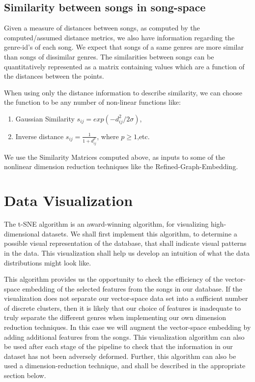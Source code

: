 \documentclass[10pt]{article}
\begin{document}
\subsection{Similarity between songs in song-space}
Given a measure of distances between songs, as computed by the computed/assumed distance metrics, we also have information regarding the genre-id's of each song. We expect that songs of a same genres are more similar than songs of dissimilar genres. The similarities between songs can be quantitatively represented as a matrix containing values which are a function of the distances between the points. 

When using only the distance information to describe similarity, we can choose the function to be any number of non-linear functions like:
\begin{enumerate}
\item Gaussian Similarity $s_{ij} = exp(-d_{ij}^2 / 2\sigma)$,
\item Inverse distance $s_{ij} = \frac{1}{1 + d_{ij}^p}$, where $p \geq 1$,etc.
\end{enumerate}
We use the Similarity Matrices computed above, as inputs to some of the nonlinear dimension reduction techniques like the Refined-Graph-Embedding.

\section{Data Visualization}
The t-SNE algorithm \cite{tSNEdataViz} is an award-winning algorithm, for visualizing high-dimensional datasets. We shall first implement this algorithm, to determine a possible visual representation of the database, that shall indicate visual patterns in the data. This visualization shall help us develop an intuition of what the data distributions might look like. 

This algorithm provides us the opportunity to check the efficiency of the vector-space embedding of the selected features from the songs in our database.  If the visualization does not separate our vector-space data set into a sufficient number of discrete clusters, then it is likely that our choice of features is inadequate to truly separate the different genres when implementing our own dimension reduction techniques.  In this case we will augment the vector-space embedding by adding additional features from the songs.  This visualization algorithm can also be used after each stage of the pipeline to check that the information in our dataset has not been adversely deformed. Further, this algorithm can also be used a dimension-reduction technique, and shall be described in the appropriate section below.
\end{document}
